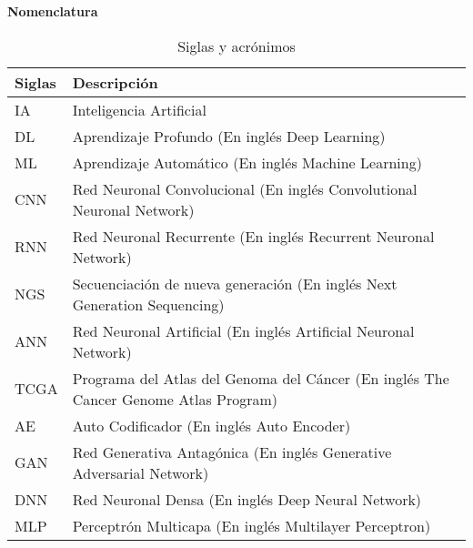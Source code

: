 \documentclass[12pt,letterpaper]{article}
\numberwithin{equation}{section}
\numberwithin{figure}{section}
\numberwithin{table}{section}
\begin{document}



\newpage
\listoffigures
{}

\newpage
\listoftables
{}

\newpage
{}


\textbf{\Large{Nomenclatura}}

\begin{table}[h]

    \centering
    \caption{Siglas y acrónimos}
    \vspace{0.3cm}
    \begin{tabular}{
    >{\centering\arraybackslash}m{3cm}
    >{\centering\arraybackslash}m{12cm}} \hline

\textbf{Siglas} & 
\textbf{Descripción} \\ \hline\hline

   IA & Inteligencia Artificial
\\[0.2cm]

   DL & Aprendizaje Profundo (En inglés Deep Learning)
\\[0.2cm]

   ML & Aprendizaje Automático (En inglés Machine Learning)
\\[0.2cm]

   CNN & Red Neuronal Convolucional (En inglés Convolutional Neuronal Network)
\\[0.2cm]
   RNN & Red Neuronal Recurrente (En inglés Recurrent Neuronal Network)
\\[0.2cm]
   NGS & Secuenciación de nueva generación (En inglés Next Generation Sequencing) 
\\[0.2cm]
   ANN & Red Neuronal Artificial (En inglés Artificial Neuronal Network) 
\\[0.2cm]
TCGA & Programa del Atlas del Genoma del Cáncer (En inglés The Cancer Genome Atlas Program) 
\\[0.2cm]
AE & Auto Codificador (En inglés Auto Encoder) 
\\[0.2cm]
GAN & Red Generativa Antagónica (En inglés Generative Adversarial Network) 
\\[0.2cm]
DNN & Red Neuronal Densa (En inglés Deep Neural Network) 
\\[0.2cm]
MLP & Perceptrón Multicapa (En inglés Multilayer Perceptron) 
\\[0.2cm]



\hline
    \end{tabular}
\end{table}
\end{document}

